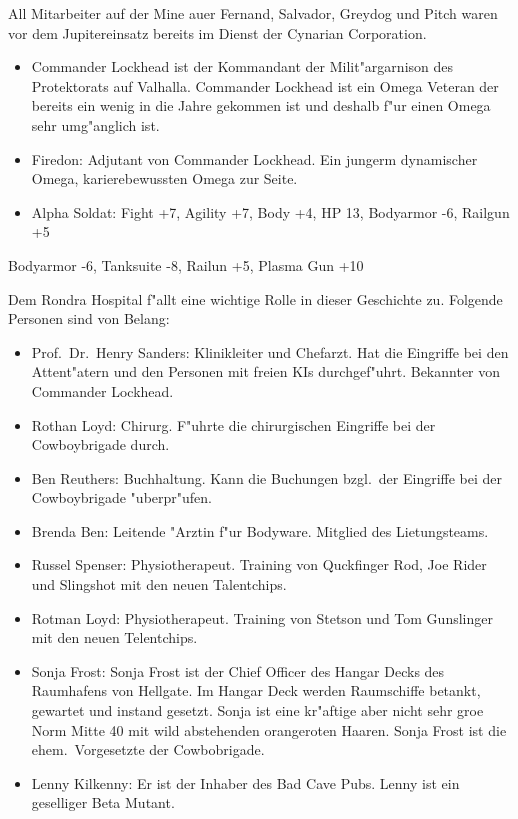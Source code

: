 All Mitarbeiter auf der Mine au\3er Fernand, Salvador, Greydog und Pitch waren vor dem Jupitereinsatz bereits im Dienst der Cynarian Corporation.


\begin{itemize}
    \item Commander Lockhead ist der Kommandant der Milit"argarnison des Protektorats auf Valhalla. Commander Lockhead ist ein Omega Veteran der bereits ein wenig in die Jahre gekommen ist und deshalb f"ur einen Omega sehr umg"anglich ist. 
    \item Firedon: Adjutant von Commander Lockhead. Ein jungerm dynamischer Omega, karierebewussten Omega zur Seite.
    \item Alpha Soldat: Fight +7, Agility +7, Body +4, HP 13, Bodyarmor -6, Railgun +5
\end{itemize}

Bodyarmor -6, Tanksuite -8, Railun +5, Plasma Gun +10


Dem Rondra Hospital f"allt eine wichtige Rolle in dieser Geschichte zu. Folgende Personen sind von Belang:

\begin{itemize}
    \item Prof.~Dr.~Henry Sanders: Klinikleiter und Chefarzt. Hat die Eingriffe bei den Attent"atern und den Personen mit freien KIs durchgef"uhrt. Bekannter von Commander Lockhead.
    \item Rothan Loyd: Chirurg. F"uhrte die chirurgischen Eingriffe bei der Cowboybrigade durch.
    \item Ben Reuthers: Buchhaltung. Kann die Buchungen bzgl.~der Eingriffe bei der Cowboybrigade "uberpr"ufen.
    \item Brenda Ben: Leitende "Arztin f"ur Bodyware. Mitglied des Lietungsteams.
    \item Russel Spenser: Physiotherapeut. Training von Quckfinger Rod, Joe Rider und Slingshot mit den neuen Talentchips.
    \item Rotman Loyd: Physiotherapeut. Training von Stetson und Tom Gunslinger mit den neuen Telentchips.    
\end{itemize}


\begin{itemize}
    \item Sonja Frost: Sonja Frost ist der Chief Officer des Hangar Decks des Raumhafens von Hellgate. Im Hangar Deck werden Raumschiffe betankt, gewartet und instand gesetzt. Sonja ist eine kr"aftige aber nicht sehr gro\3e Norm Mitte 40 mit wild abstehenden orangeroten Haaren. Sonja Frost ist die ehem.~Vorgesetzte der Cowbobrigade.
    \item Lenny Kilkenny: Er ist der Inhaber des Bad Cave Pubs. Lenny ist ein geselliger Beta Mutant.
\end{itemize}

